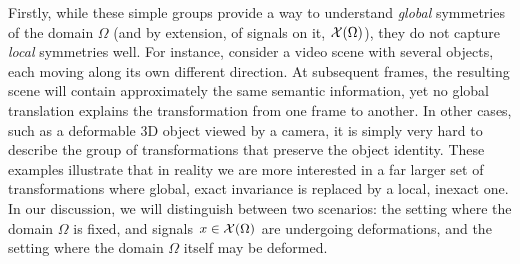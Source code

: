 Firstly, while these simple groups provide a way to understand \emph{global} symmetries of the domain $\Omega$ (and by extension, of signals on it, ${\mathcal{X}}(\Omega)$), they do not capture \emph{local} symmetries well. 
%
For instance, consider a video scene %
with several objects, each moving along its own different direction.
At subsequent frames, the resulting scene 
will contain approximately the same semantic information, yet no global translation explains the transformation from one frame to another.
In other cases, such as a deformable 3D object viewed by a camera, it is simply very hard to describe the group of transformations that preserve the object identity.
These examples illustrate that in reality we are more interested in a %
far larger set of transformations where global, exact invariance is replaced by a local, inexact one.
%
In our discussion, we will distinguish between two scenarios: the setting where the domain $\Omega$ is fixed, and signals $x \in {\mathcal{X}}(\Omega)$ are undergoing deformations, and the setting where the domain $\Omega$ itself may be deformed.


